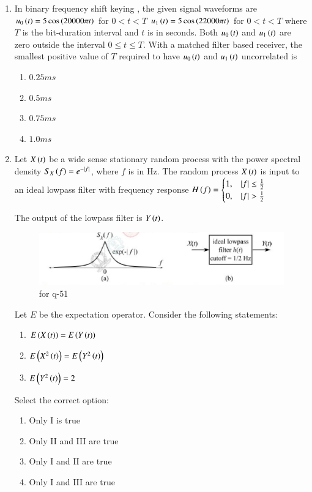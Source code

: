 \documentclass[journal,12pt,onecolumn]{IEEEtran}
\theoremstyle{remark}
\begin{document}
\begin{enumerate}
\item In binary frequency shift keying , the given signal waveforms are  
$u_0\left(t\right) = 5 \cos\left(20000\pi t\right)$ for $0 < t < T$  
$u_1\left(t\right) = 5 \cos\left(22000\pi t\right)$ for $0 < t < T$  
where $T$ is the bit-duration interval and $t$ is in seconds. Both $u_0\left(t\right)$ and $u_1\left(t\right)$ are zero outside the interval $0 \leq t \leq T$. With a matched filter  based receiver, the smallest positive value of $T$  required to have $u_0\left(t\right)$ and $u_1\left(t\right)$ uncorrelated is
\begin{multicols}{4}
\begin{enumerate}
\item $0.25ms$
\item $0.5ms$
\item $0.75ms$
\item $1.0ms$
\end{enumerate}
\end{multicols}
\hfill {}

\item Let $X\left(t\right)$ be a wide sense stationary random process with the power spectral density $S_X\left(f\right) = e^{-|f|}$, where $f$ is in Hz. The random process $X\left(t\right)$ is input to an ideal lowpass filter with frequency response  
$H\left(f\right) = \begin{cases}
1, & |f| \leq \frac{1}{2} \\
0, & |f| > \frac{1}{2}
\end{cases}$  

The output of the lowpass filter is $Y\left(t\right)$. 
\begin{figure}[H]
    \centering
    \includegraphics[width=0.5\columnwidth]{figs/21.png}
    \caption{\centering for q-51}
    \label{fig:placeholder_21}
\end{figure}
Let $E$ be the expectation operator. Consider the following statements:  
\begin{enumerate}[label=\Roman*.]
    \item $E\left(X\left(t\right)\right) = E\left(Y\left(t\right)\right)$ 
    \item $E\left(X^2\left(t\right)\right) = E\left(Y^2\left(t\right)\right)$  
    \item $E\left(Y^2\left(t\right)\right) = 2$  
\end{enumerate}
Select the correct option:  
\begin{multicols}{2}
\begin{enumerate}
\item Only I is true
\item Only II and III are true
\item Only I and II are true
\item Only I and III are true
\end{enumerate}
\end{multicols}
\hfill {}


\end{enumerate}
\end{document}
